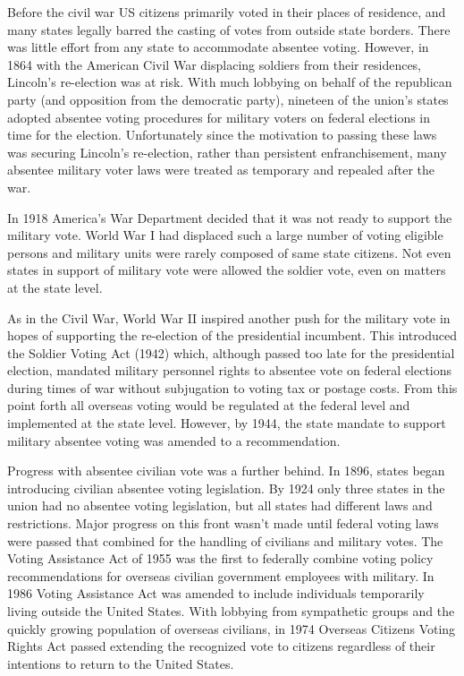 Before the civil war US citizens primarily voted in their places of residence, and many states legally barred the casting of votes from outside state borders. There was little effort from any state to accommodate absentee voting. However, in 1864 with the American Civil War displacing soldiers from their residences, Lincoln's re-election was at risk. With much lobbying on behalf of the republican party (and opposition from the democratic party), nineteen of the union's states adopted absentee voting procedures for military voters on federal elections in time for the election. Unfortunately since the motivation to passing these laws was securing Lincoln's re-election, rather than persistent enfranchisement, many absentee military voter laws were treated as temporary and repealed after the war.

In 1918 America's War Department decided that it was not ready to support the military vote. World War I had displaced such a large number of voting eligible persons and military units were rarely composed of same state citizens. Not even states in support of military vote were allowed the soldier vote, even on matters at the state level.

As in the Civil War, World War II inspired another push for the military vote in hopes of supporting the re-election of the presidential incumbent. This introduced the Soldier Voting Act (1942) which, although passed too late for the presidential election, mandated military personnel rights to absentee vote on federal elections during times of war without subjugation to voting tax or postage costs. From this point forth all overseas voting would be regulated at the federal level and implemented at the state level. However, by 1944, the state mandate to support military absentee voting was amended to a recommendation.

Progress with absentee civilian vote was a further behind. In 1896, states began introducing civilian absentee voting legislation. By 1924 only three states in the union had no absentee voting legislation, but all states had different laws and restrictions. Major progress on this front wasn't made until federal voting laws were passed that combined for the handling of civilians and military votes. The Voting Assistance Act of 1955 was the first to federally combine voting policy recommendations for overseas civilian government employees with military. In 1986 Voting Assistance Act was amended to include individuals temporarily living outside the United States. With lobbying from sympathetic groups and the quickly growing population of overseas civilians, in 1974 Overseas Citizens Voting Rights Act passed extending the recognized vote to citizens regardless of their intentions to return to the United States.

